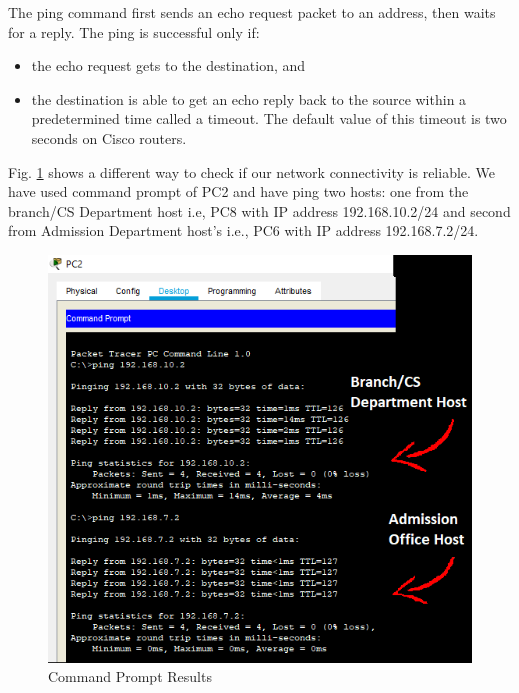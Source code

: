 \noindent The ping command first sends an echo request packet to an address, then waits for a reply. The ping is successful only if:
\begin{itemize}
\item the echo request gets to the destination, and

\item the destination is able to get an echo reply back to the source within a predetermined time called a timeout. The default value of this timeout is two seconds on Cisco routers.
\end{itemize}
\noindent Fig. \ref{commandPrompt} shows a different way to check if our network connectivity is reliable. We have used command prompt of PC2 and have ping two hosts: one from the branch/CS Department host i.e, PC8 with IP address 192.168.10.2/24 and second from Admission Department host's i.e., PC6 with IP address 192.168.7.2/24.
\begin{figure}[H]  %
\begin{center}
\includegraphics[scale=1.0]{Chapter4/commandPrompt}
\caption{Command Prompt Results}
\label{commandPrompt}
\end{center}
\end{figure}



